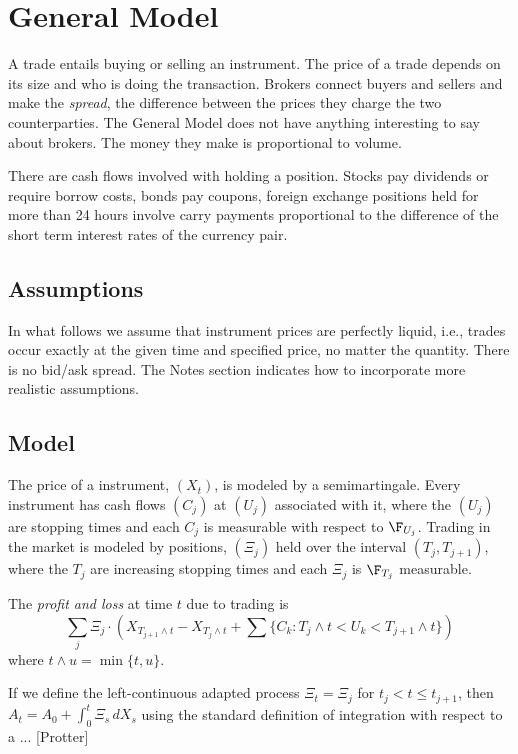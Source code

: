 \chapter{General Model} 
\label{gm}

A trade entails buying or selling an instrument. The price
of a trade depends on its size
and who is doing the transaction. Brokers
connect buyers and sellers and make the {\em spread},
the difference between the prices they charge
the two counterparties. 
The General Model does not have anything
interesting to say about brokers. The money they make is 
proportional to volume.

There are cash flows involved with holding a position.
Stocks pay dividends or require borrow costs, bonds pay coupons, 
foreign exchange positions held for more than 24 hours
involve carry payments proportional to the difference of the
short term interest rates of the currency pair.

\section{Assumptions}
In what follows we assume that instrument prices
are perfectly liquid, i.e., trades occur exactly at the
given time and specified price, no matter the
quantity. There is no bid/ask spread. The Notes section
indicates how to incorporate more realistic assumptions.

\section{Model}
The price of a instrument, $(X_t)$, is modeled by a semimartingale.
Every instrument has cash flows $(C_j)$ at $(U_j)$ associated with it,
where the $(U_j)$ are stopping times and each $C_j$ is measurable with
respect to $\F_{U_j}$. Trading in the market is modeled by positions,
$(\Xi_j)$ held over the interval $(T_j, T_{j+1})$, where the $T_j$
are increasing stopping times and each $\Xi_j$ is $\F_{T_j}$ measurable.

The {\em profit and loss} at time $t$ due to trading is \begin{equation*}
\sum_j \Xi_j\cdot(X_{T_{j + 1}\wedge t} - X_{T_{j}\wedge t} + \sum \{
C_k : T_j\wedge t < U_k < T_{j+1}\wedge t\}) \end{equation*} where
$t\wedge u = \min\{t, u\}$.

If we define the left-continuous adapted process $\Xi_t = \Xi_j$ 
for $t_j < t \le t_{j+1}$, then $A_t = A_0 + \int_0^t \Xi_s\,dX_s$
using the standard definition of integration with respect to
a ... [Protter]
